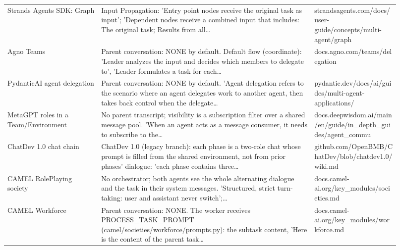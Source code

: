 \begin{longtable}{p{0.22\linewidth}p{0.5\linewidth}p{0.2\linewidth}}
Strands Agents SDK: Graph & Input Propagation: 'Entry point nodes receive the original task as input'; 'Dependent nodes receive a combined input that includes: The original task; Results from all\ldots & strandsagent\allowbreak{}s.\allowbreak{}com/\allowbreak{}docs/\allowbreak{}user-\allowbreak{}guide/\allowbreak{}concepts/\allowbreak{}multi-\allowbreak{}agent/\allowbreak{}graph \\
Agno Teams & Parent conversation: NONE by default.\allowbreak{} Default flow (coordinate): 'Leader analyzes the input and decides which members to delegate to', 'Leader formulates a task for each\ldots & docs.\allowbreak{}agno.\allowbreak{}com/\allowbreak{}teams/\allowbreak{}delegation \\
PydanticAI agent delegation & Parent conversation: NONE by default.\allowbreak{} 'Agent delegation refers to the scenario where an agent delegates work to another agent, then takes back control when the delegate\ldots & pydantic.\allowbreak{}dev/\allowbreak{}docs/\allowbreak{}ai/\allowbreak{}guides/\allowbreak{}multi-\allowbreak{}agent-\allowbreak{}applications/\allowbreak{} \\
MetaGPT roles in a Team/\allowbreak{}Environment & No parent transcript; visibility is a subscription filter over a shared message pool.\allowbreak{} 'When an agent acts as a message consumer, it needs to subscribe to the\ldots & docs.\allowbreak{}deepwisdom.\allowbreak{}ai/\allowbreak{}main/\allowbreak{}en/\allowbreak{}guide/\allowbreak{}in\_\allowbreak{}depth\_\allowbreak{}guides/\allowbreak{}agent\_\allowbreak{}commu \\
ChatDev 1.\allowbreak{}0 chat chain & ChatDev 1.\allowbreak{}0 (legacy branch): each phase is a two-\allowbreak{}role chat whose prompt is filled from the shared environment, not from prior phases' dialogue: 'each phase contains three\ldots & github.\allowbreak{}com/\allowbreak{}OpenBMB/\allowbreak{}ChatDev/\allowbreak{}blob/\allowbreak{}chatdev1.\allowbreak{}0/\allowbreak{}wiki.\allowbreak{}md \\
CAMEL RolePlaying society & No orchestrator; both agents see the whole alternating dialogue and the task in their system messages.\allowbreak{} 'Structured, strict turn-\allowbreak{}taking: user and assistant never switch';\ldots & docs.\allowbreak{}camel-\allowbreak{}ai.\allowbreak{}org/\allowbreak{}key\_\allowbreak{}modules/\allowbreak{}societies.\allowbreak{}md \\
CAMEL Workforce & Parent conversation: NONE.\allowbreak{} The worker receives PROCESS\_\allowbreak{}TASK\_\allowbreak{}PROMPT (camel/\allowbreak{}societies/\allowbreak{}workforce/\allowbreak{}prompts.\allowbreak{}py): the subtask content, 'Here is the content of the parent task\ldots & docs.\allowbreak{}camel-\allowbreak{}ai.\allowbreak{}org/\allowbreak{}key\_\allowbreak{}modules/\allowbreak{}workforce.\allowbreak{}md \\

\end{longtable}
